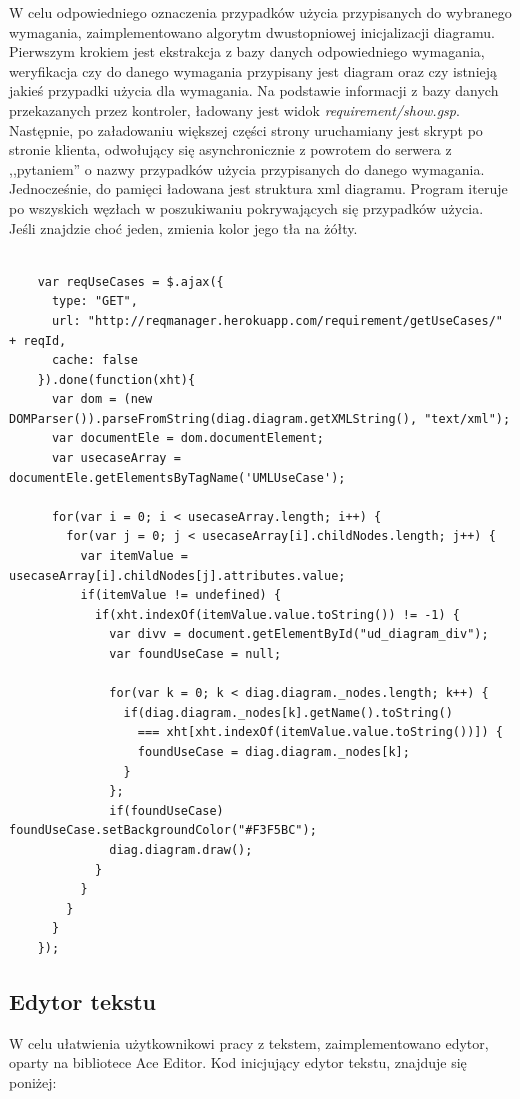       W celu odpowiedniego oznaczenia przypadków użycia przypisanych do wybranego wymagania, zaimplementowano algorytm dwustopniowej inicjalizacji diagramu. Pierwszym krokiem jest ekstrakcja z bazy danych odpowiedniego wymagania, weryfikacja czy do danego wymagania przypisany jest diagram oraz czy istnieją jakieś przypadki użycia dla wymagania. Na podstawie informacji z bazy danych przekazanych przez kontroler, ładowany jest widok \emph{requirement/show.gsp}. Następnie, po załadowaniu większej części strony uruchamiany jest skrypt po stronie klienta, odwołujący się asynchronicznie z powrotem do serwera z ,,pytaniem'' o nazwy przypadków użycia przypisanych do danego wymagania. Jednocześnie, do pamięci ładowana jest struktura xml diagramu. Program iteruje po wszyskich węzłach w poszukiwaniu pokrywających się przypadków użycia. Jeśli znajdzie choć jeden, zmienia kolor jego tła na żółty.
      
    
    \begin{lstlisting}[caption={Kolorowanie tła przypadków użycia}, label={lst:colorUC}]

    var reqUseCases = $.ajax({
      type: "GET",
      url: "http://reqmanager.herokuapp.com/requirement/getUseCases/" + reqId,
      cache: false
    }).done(function(xht){ 
      var dom = (new DOMParser()).parseFromString(diag.diagram.getXMLString(), "text/xml");
      var documentEle = dom.documentElement;
      var usecaseArray = documentEle.getElementsByTagName('UMLUseCase');

      for(var i = 0; i < usecaseArray.length; i++) {
        for(var j = 0; j < usecaseArray[i].childNodes.length; j++) {
          var itemValue = usecaseArray[i].childNodes[j].attributes.value;
          if(itemValue != undefined) {
            if(xht.indexOf(itemValue.value.toString()) != -1) {
              var divv = document.getElementById("ud_diagram_div");
              var foundUseCase = null;

              for(var k = 0; k < diag.diagram._nodes.length; k++) {
                if(diag.diagram._nodes[k].getName().toString() 
                  === xht[xht.indexOf(itemValue.value.toString())]) {
                  foundUseCase = diag.diagram._nodes[k]; 
                }
              };
              if(foundUseCase) foundUseCase.setBackgroundColor("#F3F5BC");
              diag.diagram.draw();
            }
          }
        }
      }
    });
    \end{lstlisting}

    \subsection{Edytor tekstu}
      W celu ułatwienia użytkownikowi pracy z tekstem, zaimplementowano edytor, oparty na bibliotece Ace Editor. 
      Kod inicjujący edytor tekstu, znajduje się poniżej:

